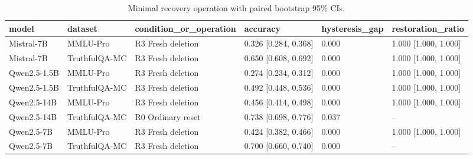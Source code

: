 \begin{table}
\caption{Minimal recovery operation with paired bootstrap 95\% CIs.}
\label{tab:minimal-recovery-ci}
\begin{tabular}{llllll}
\toprule
model & dataset & condition\_or\_operation & accuracy & hysteresis\_gap & restoration\_ratio \\
\midrule
Mistral-7B & MMLU-Pro & R3 Fresh deletion & 0.326 [0.284, 0.368] & 0.000 & 1.000 [1.000, 1.000] \\
Mistral-7B & TruthfulQA-MC & R3 Fresh deletion & 0.650 [0.608, 0.692] & 0.000 & 1.000 [1.000, 1.000] \\
Qwen2.5-1.5B & MMLU-Pro & R3 Fresh deletion & 0.274 [0.234, 0.312] & 0.000 & 1.000 [1.000, 1.000] \\
Qwen2.5-1.5B & TruthfulQA-MC & R3 Fresh deletion & 0.492 [0.448, 0.536] & 0.000 & 1.000 [1.000, 1.000] \\
Qwen2.5-14B & MMLU-Pro & R3 Fresh deletion & 0.456 [0.414, 0.498] & 0.000 & 1.000 [1.000, 1.000] \\
Qwen2.5-14B & TruthfulQA-MC & R0 Ordinary reset & 0.738 [0.698, 0.776] & 0.037 & -- \\
Qwen2.5-7B & MMLU-Pro & R3 Fresh deletion & 0.424 [0.382, 0.466] & 0.000 & 1.000 [1.000, 1.000] \\
Qwen2.5-7B & TruthfulQA-MC & R3 Fresh deletion & 0.700 [0.660, 0.740] & 0.000 & -- \\
\bottomrule
\end{tabular}
\end{table}
